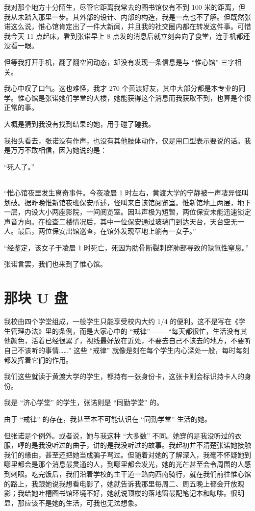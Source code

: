 \documentclass[UTF8]{ctexart}
\begin{document}
我对那个地方十分陌生，尽管它距离我常去的图书馆仅有不到 100 米的距离，但我从未踏入那里一步。其外部的设计、内部的构造，我是一点也不了解。但既然张诺这么说，惟心馆肯定出了一件大新闻，并且我的社交圈内都在转发这件事。可惜我今天 11 点起床，看到张诺早上 8 点发的消息后就立刻奔向了食堂，连手机都还没看一眼。

但等我打开手机，翻了翻空间动态，却没有发现一条信息是与 “惟心馆” 三字相关。

我心中叹了口气。这也难怪，我才 270 个黄渡好友，其中大部分都是本专业的同学。惟心馆是张诺她们学堂的大楼，她能获得这个消息而我获取不到，也算是个很正常的事。

大概是猜到我没有找到结果的她，用手碰了碰我。

我抬头看去，张诺没有作声，也没有其他肢体动作，仅是用口型表示要说的话。我是万万不敢相信，因为她说的是：

“死人了。”

~\\

“惟心馆夜里发生离奇事件。今夜凌晨 1 时左右，黄渡大学的宁静被一声凄异怪叫划破。据昨晚惟新馆夜班保安所述，怪叫来自该馆阅览室。惟新馆地上两层，地下一层，内设大小两座影院，一间阅览室。因叫声极为短暂，两位保安未能迅速锁定声音方向。在检查二楼情况后，其中一位保安通过玻璃门到达天台，天台空无一人。最后，两位保安出馆巡查，在馆外发现草地上躺有一女子。”

“经鉴定，该女子于凌晨 1 时死亡，死因为肋骨断裂刺穿肺部导致的缺氧性窒息。”

张诺言罢，我们也来到了惟心馆。

\section{那块 U 盘}

我校由四个学堂组成，一般学生只能享受校内大约 1/4 的便利。这不是写在《学生管理办法》里的条例，而是大家心中的 “戒律” —— “每天都很忙，生活没有其他颜色，活着已经很累了，视线最好放在近处，不要去自己不该去的地方，不要听自己不该听的事情……” 这些 “戒律” 就像是刻在每个学生内心深处一般，每时每刻都发挥着它们的作用。

我们这些就读于黄渡大学的学生，都持有一张身份卡，这张卡则会标识持卡人的身份。

我是 “济心学堂” 的学生，张诺则是 “同勤学堂” 的。

由于 “戒律” 的存在，我甚至本不可能认识在 “同勤学堂” 生活的她。

但张诺是个例外。或者说，她与我这种 “大多数” 不同。她穿的是我没听过的衣服，哼的是我没听过的曲子，讲的是我没听过的故事。我起初并不清楚张诺她接触我们的缘由，甚至还把她当成骗子骂过。但随着对她的了解深入，我毫不怀疑她到哪里都会是那个消息最灵通的人，到哪里都会发光，她的光芒甚至会令周围的人感到刺眼。吃完饭后，我们沿着学校的主干道一路向西南骑行，就在我们前往惟心馆的路上，我跟她说我想看电影了，她就告诉我那里每周二、周五晚上都会开放观影；我给她吐槽图书馆环境不好，她就说顶楼的落地窗最配笔记本和咖啡。很明显，那应该不是她的生活，可我也无法想象。
\end{document}
